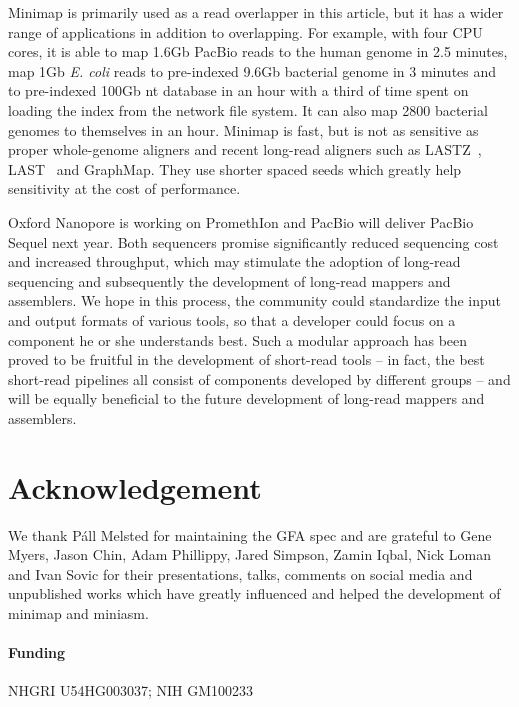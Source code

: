 \documentclass{bioinfo}
\begin{document}
Minimap is primarily used as a read overlapper in this article, but it has a
wider range of applications in addition to overlapping.  For example, with four
CPU cores, it is able to map 1.6Gb PacBio reads to the human genome in 2.5
minutes, map 1Gb {\it E. coli} reads to pre-indexed 9.6Gb bacterial genome in 3
minutes and to pre-indexed 100Gb nt database in an hour with a third of time
spent on loading the index from the network file system. It can also map 2800
bacterial genomes to themselves in an hour. Minimap is fast, but is not as
sensitive as proper whole-genome aligners and recent long-read aligners such as
LASTZ~\citep{harris:2007aa}, LAST~\citep{Kiebasa:2011aa} and GraphMap. They use
shorter spaced seeds which greatly help sensitivity at the cost of performance.

Oxford Nanopore is working on PromethIon and PacBio will deliver PacBio Sequel
next year. Both sequencers promise significantly reduced sequencing cost and
increased throughput, which may stimulate the adoption of long-read sequencing
and subsequently the development of long-read mappers and assemblers. We hope
in this process, the community could standardize the input and output formats
of various tools, so that a developer could focus on a component he or she
understands best. Such a modular approach has been proved to be fruitful in the
development of short-read tools -- in fact, the best short-read pipelines all
consist of components developed by different groups -- and will be equally
beneficial to the future development of long-read mappers and assemblers.

\section*{Acknowledgement}

We thank P\'all Melsted for maintaining the GFA spec and are grateful to Gene
Myers, Jason Chin, Adam Phillippy, Jared Simpson, Zamin Iqbal, Nick Loman and
Ivan Sovic for their presentations, talks, comments on social media and
unpublished works which have greatly influenced and helped the development of
minimap and miniasm.

\paragraph{Funding\textcolon} NHGRI U54HG003037; NIH GM100233


\end{document}
